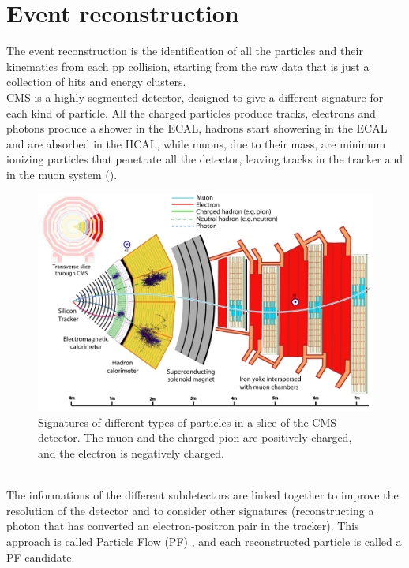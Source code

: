 
\label{sec:RECO}
\minitoc

\section{Event reconstruction}\label{sec:PF}
The event reconstruction is the identification of all the particles and their kinematics from each pp collision, starting from the raw data that is just a collection of hits and energy clusters.\\
CMS is a highly segmented detector, designed to give a different signature for each kind of particle.
All the charged particles produce tracks, electrons and photons produce a shower in the ECAL, hadrons start showering in the ECAL and are absorbed in the HCAL, while muons, due to their mass, are minimum ionizing particles that penetrate all the detector, leaving tracks in the tracker and in the muon system ().
\begin{figure}[h!]
    \centering
    \includegraphics[width=\linewidth]{fig//chap04-reco/CMS_detector_PID_edit.pdf}
    \caption{Signatures of different types of particles in a slice of the CMS detector. The muon and the charged pion are positively charged, and the electron is negatively charged. \cite{Sirunyan2017Particle-flowDetector}}
    \label{fig:PF}
\end{figure}
\\
The informations of the different subdetectors are linked together to improve the resolution of the detector and to consider other signatures (\eg reconstructing a photon that has converted an electron-positron pair in the tracker).
This approach is called Particle Flow (PF) \cite{Sirunyan2017Particle-flowDetector}, and each reconstructed particle is called a PF candidate.



